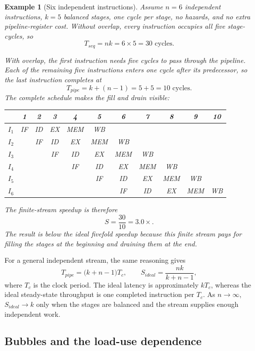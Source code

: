 \documentclass[11pt]{article}
\newtheorem{example}{Example}[section]
\begin{document}
\begin{example}[Six independent instructions]
Assume $n=6$ independent instructions, $k=5$ balanced stages, one cycle per
stage, no hazards, and no extra pipeline-register cost. Without overlap, every
instruction occupies all five stage-cycles, so
\[
  T_{seq}=nk=6\times5=30\text{ cycles}.
\]

With overlap, the first instruction needs five cycles to pass through the
pipeline. Each of the remaining five instructions enters one cycle after its
predecessor, so the last instruction completes at
\[
  T_{pipe}=k+(n-1)=5+5=10\text{ cycles}.
\]
The complete schedule makes the fill and drain visible:
\begin{center}
\scriptsize
\begin{tabular}{@{}c|cccccccccc@{}}
\toprule
 & 1 & 2 & 3 & 4 & 5 & 6 & 7 & 8 & 9 & 10\\
\midrule
$I_1$ & IF & ID & EX & MEM & WB & & & & &\\
$I_2$ & & IF & ID & EX & MEM & WB & & & &\\
$I_3$ & & & IF & ID & EX & MEM & WB & & &\\
$I_4$ & & & & IF & ID & EX & MEM & WB & &\\
$I_5$ & & & & & IF & ID & EX & MEM & WB &\\
$I_6$ & & & & & & IF & ID & EX & MEM & WB\\
\bottomrule
\end{tabular}
\end{center}
The finite-stream speedup is therefore
\[
  S=\frac{30}{10}=3.0\times.
\]
The result is below the ideal fivefold speedup because this finite stream pays
for filling the stages at the beginning and draining them at the end.
\end{example}

For a general independent stream, the same reasoning gives
\[
  T_{pipe}=\bigl(k+n-1\bigr)T_c,
  \qquad
  S_{ideal}=\frac{nk}{k+n-1},
\]
where $T_c$ is the clock period. The ideal latency is approximately $kT_c$,
whereas the ideal steady-state throughput is one completed instruction per
$T_c$. As $n\to\infty$, $S_{ideal}\to k$ only when the stages are balanced and
the stream supplies enough independent work.

\subsection{Bubbles and the load-use dependence}
\end{document}
